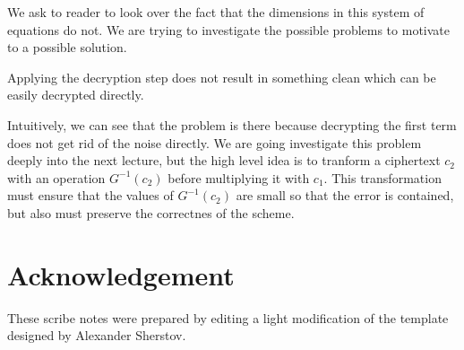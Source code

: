 \documentclass[usletter]{article}
\begin{document}
We ask to reader to look over the fact that the dimensions in this system of equations do not. We are trying to investigate the possible problems to motivate to a possible solution.

\begin{problem}
	Applying the decryption step does not result in something clean which can be easily decrypted directly.
\end{problem}
Intuitively, we can see that the problem is there because decrypting the first term does not get rid of the noise directly. We are going investigate this problem deeply into the next lecture, but the high level idea is to tranform a ciphertext $c_2$ with an operation $G^{-1}(c_2)$ before multiplying it with $c_1$. This transformation must ensure that the values of $G^{-1}(c_2)$ are small so that the error is contained, but also must preserve the correctnes of the scheme.

\section*{Acknowledgement}
These scribe notes were prepared by editing a light modification of the template designed by Alexander Sherstov.



\end{document}
